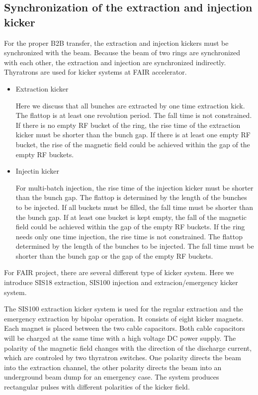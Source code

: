 \subsection{Synchronization of the extraction and injection kicker}
For the proper B2B transfer, the extraction and injection kickers must be synchronized with the beam. Because the beam of two rings are synchronized with each other, the extraction and injection are synchronized indirectly. Thyratrons are used for kicker systems at FAIR accelerator. 
\begin{itemize}
	\item Extraction kicker
		
Here we discuss that all bunches are extracted by one time extraction kick. The flattop is at least one revolution period. The fall time is not constrained. If there is no empty RF bucket of the ring, the rise time of the extraction kicker must be shorter than the bunch gap. If there is at least one empty RF bucket, the rise of the magnetic field could be achieved within the gap of the empty RF buckets. 

	\item Injectin kicker

For multi-batch injection, the rise time of the injection kicker must be shorter than the bunch gap. The flattop is determined by the length of the bunches to be injected. If all buckets must be filled, the fall time must be shorter than the bunch gap. If at least one bucket is kept empty, the fall of the magnetic field could be achieved within the gap of the empty RF buckets. If the ring needs only one time injection, the rise time is not constrained. The flattop determined by the length of the bunches to be injected. The fall time must be shorter than the bunch gap or the gap of the empty RF buckets. 

\end{itemize}

For FAIR project, there are several different type of kicker system. Here we introduce SIS18 extraction, SIS100 injection and extracion/emergency kicker system.

The SIS100 extraction kicker system is used for the regular extraction and the emergency extraction by bipolar operation. It consists of eight kicker magnets. Each magnet is placed between the two cable capacitors. Both cable capacitors will be charged at the same time with a high voltage DC power supply. The polarity of the magnetic field changes with the direction of the discharge current, which are controled by two thyratron switches. One polarity directs the beam into the extraction channel, the other polarity directs the beam into an underground beam dump for an emergency case. The system produces rectangular pulses with different polarities of the kicker field.

